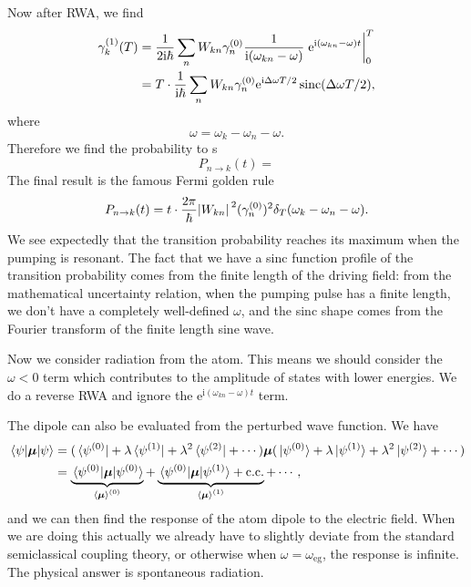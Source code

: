 \documentclass[hyperref, a4paper]{article}
\DeclareMathOperator{\sinc}{sinc}
\newcommand*{\ii}{\mathrm{i}}
\newcommand*{\ee}{\mathrm{e}}
\begin{document}
Now after RWA, we find 
\begin{equation}
    \begin{aligned}
        \gamma^{(1)}_{k}(T) &= \frac{1}{2 \ii \hbar} 
            \sum_n W_{kn} \gamma^{(0)}_n
            \frac{1}{\ii (\omega_{kn} - \omega)}
            \eval{
                \ee^{\ii (\omega_{kn} - \omega) t} 
            }_{0}^T  \\
        &= T \cdot \frac{1}{\ii \hbar} \sum_n 
            W_{kn} \gamma^{(0)}_n \ee^{\ii \Delta \omega T / 2} 
            \sinc(\Delta \omega T / 2),
    \end{aligned} 
\end{equation}
where 
\begin{equation}
    \omega = \omega_k - \omega_n - \omega.
\end{equation}
Therefore we find the probability to s
\begin{equation}
    P_{n \to k}(t) = 
\end{equation}
The final result is the famous Fermi golden rule
\begin{equation}
    P_{n \to k} (t) = t \cdot \frac{2\pi}{\hbar} \abs*{W_{kn}}^2 (\gamma^{(0)}_n)^2 
    \delta_T(\omega_k - \omega_n - \omega).
\end{equation}
We see expectedly that the transition probability reaches its maximum  
when the pumping is resonant.
The fact that we have a sinc function profile of the transition probability 
comes from the finite length of the driving field:
from the mathematical uncertainty relation,
when the pumping pulse has a finite length, 
we don't have a completely well-defined $\omega$,
and the sinc shape comes from the  
Fourier transform of the finite length sine wave.

Now we consider radiation from the atom.
This means we should consider the $\omega < 0$ term 
which contributes to the amplitude of states with lower energies.
We do a reverse RWA and ignore the $\ee^{\ii (\omega_{kn} - \omega) t}$ term.

The dipole can also be evaluated from the perturbed wave function.
We have 
\begin{equation}
    \begin{aligned}
        \expval*{\vb*{\mu}}{\psi} &= 
            (\bra*{\psi^{(0)}} + \lambda \bra*{\psi^{(1)}} + \lambda^2 \bra*{\psi^{(2)}} + \cdots)
            \vb*{\mu} (\ket*{\psi^{(0)}} + \lambda \ket*{\psi^{(1)}} + \lambda^2 \ket*{\psi^{(2)}} + \cdots) \\
        &= \underbrace{
            \expval*{\vb*{\mu}}{\psi^{(0)}}
        }_{\expval{\vb*{\mu}}^{(0)}}  + 
        \underbrace{
            \mel*{\psi^{(0)}}{\vb*{\mu}}{\psi^{(1)}} + \text{c.c.}
        }_{\expval*{\vb*{\mu}}^{(1)}} + \cdots,
    \end{aligned}
\end{equation} 
and we can then find the response of the atom dipole to the electric field.
When we are doing this actually we already have to 
slightly deviate from the standard semiclassical coupling theory,
or otherwise when $\omega = \omega_{\text{eg}}$, 
the response is infinite.
The physical answer is spontaneous radiation.
\end{document}

